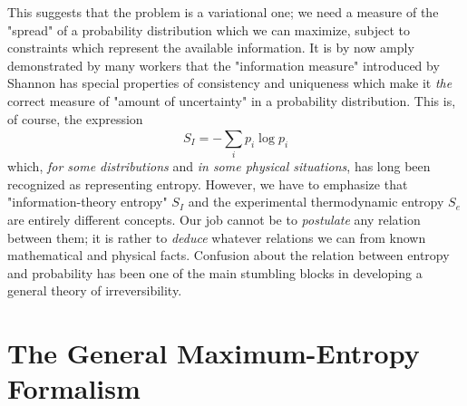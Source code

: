 \documentclass[]{article}
\begin{document}
This suggests that the problem is a variational one; we need a measure of the "spread" of a probability distribution which we can maximize, subject to constraints which represent the available information. It is by now amply demonstrated by many workers that the "information measure" introduced by Shannon\citep{Shannon-mathematical48} has special properties of consistency and uniqueness which make it \emph{the} correct measure of "amount of uncertainty" in a probability distribution. This is, of course, the expression
%
\begin{equation}
S_{I} = - \sum_{i}^{} p_{i}\log p_{i}
\end{equation}
%
which, \emph{for some distributions} and \emph{in some physical situations}, has long been recognized as representing entropy. However, we have to emphasize that "information-theory entropy" $S _{ I }$ and the experimental thermodynamic entropy $S _{e}$ are entirely different concepts. Our job cannot be to \emph{postulate} any relation between them; it is rather to \emph{deduce} whatever relations we can from known mathematical and physical facts. Confusion about the relation between entropy and probability has been one of the main stumbling blocks in developing a general theory of irreversibility.

\section{The General Maximum-Entropy Formalism}\label{the-general-maximum-entropy-formalism}
\end{document}
